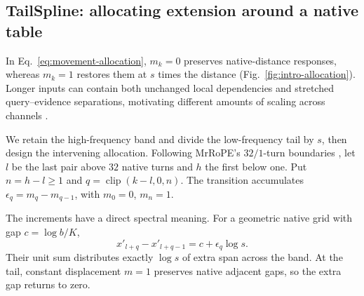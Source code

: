 \subsection{TailSpline: allocating extension around a native table}
\label{sec:mature-adjustments}\label{sec:exp-zero-training-system}\label{sec:coordinate}\label{sec:bm-main}
In Eq.~\eqref{eq:movement-allocation}, $m_k=0$ preserves native-distance
responses, whereas $m_k=1$ restores them at $s$ times the distance
(Fig.~\ref{fig:intro-allocation}). Longer inputs can contain both unchanged
local dependencies and stretched query--evidence separations, motivating
different amounts of scaling across channels \citep{wu2026datashapes}.

We retain the high-frequency band and divide the low-frequency tail by $s$,
then design the intervening allocation. Following MrRoPE's $32/1$-turn
boundaries \citep{tian2026mrrope}, let $l$ be the last pair above $32$ native
turns and $h$ the first below one. Put $n=h-l\ge1$ and
$q=\operatorname{clip}(k-l,0,n)$. The transition accumulates
$\epsilon_q=m_q-m_{q-1}$, with $m_0=0$, $m_n=1$.

The increments have a direct spectral meaning. For a geometric native grid with gap $c=\log b/K$,
\begin{equation}
x'_{l+q}-x'_{l+q-1}=c+\epsilon_q\log s.
\label{eq:increment-log-gap}
\end{equation}
Their unit sum distributes exactly $\log s$ of extra span across the band.
At the tail, constant displacement $m=1$ preserves native adjacent gaps,
so the extra gap returns to zero.

